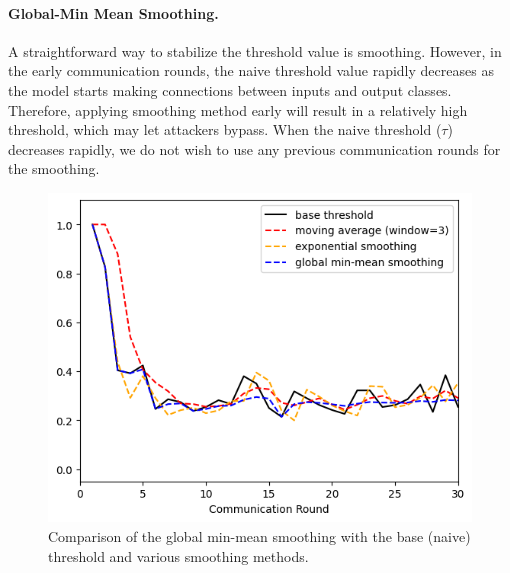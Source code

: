 \documentclass{article} %
\begin{document}
\paragraph{Global-Min Mean Smoothing.} 
A straightforward way to stabilize the threshold value is smoothing. However, in the early communication rounds, the naive threshold value rapidly decreases as the model starts making connections between inputs and output classes. Therefore, applying smoothing method early will result in a relatively high threshold, which may let attackers bypass. 
When the naive threshold ($\tau$) decreases rapidly, we do not wish to use any previous communication rounds for the smoothing. 

\begin{figure}
    \vspace{-15pt}
    \includegraphics[width=.4\textwidth]{make_article/make_visuals/visuals/smoothing--d_rounds30.png}
    \vspace{-15pt}
    \caption{\footnotesize Comparison of the global min-mean smoothing with the base (naive) threshold and various smoothing methods. 
    }
    \vspace{-0.8cm}
    \label{fig: smoothing}
\end{figure}
\end{document}

